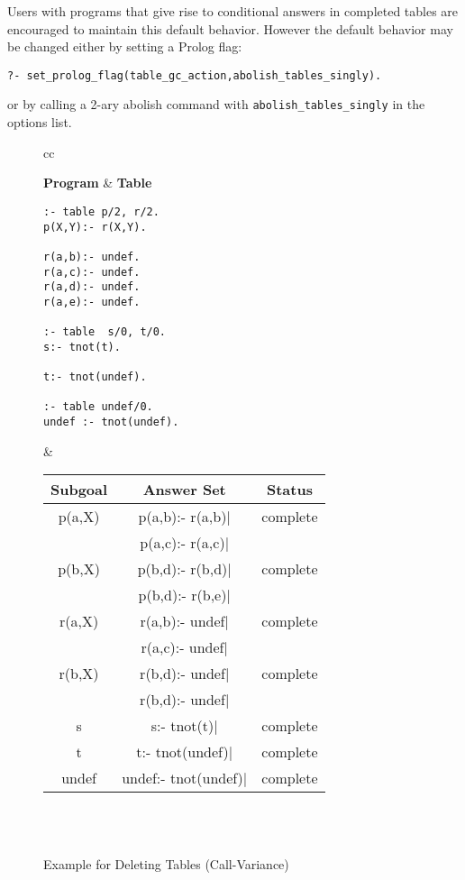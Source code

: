 \begin{description}
Users with programs that give rise to conditional answers in completed
tables are encouraged to maintain this default behavior.  However the
default behavior may be changed either by setting a Prolog flag:
%
\begin{verbatim}
?- set_prolog_flag(table_gc_action,abolish_tables_singly).
\end{verbatim}
%
or by calling a 2-ary abolish command with {\tt abolish\_tables\_singly}
in the options list.

\begin{figure}[htb]
\begin{center}
\begin{tabular}{cc}\hline \hline
\rule[-2ex]{0ex}{5ex} \textbf{Program} & \textbf{Table} \\
\begin{minipage}{14.5em}
\begin{verbatim}
:- table p/2, r/2.
p(X,Y):- r(X,Y).

r(a,b):- undef.
r(a,c):- undef.
r(a,d):- undef.
r(a,e):- undef.

:- table  s/0, t/0.
s:- tnot(t).

t:- tnot(undef).

:- table undef/0.
undef :- tnot(undef).
\end{verbatim}
\end{minipage}
&
\begin{tabular}{|c|c|c|} \hline
  Subgoal & Answer Set & Status\\ \hline \hline
  p(a,X)  & p(a,b):- r(a,b)$|$ & complete \\ 
          & p(a,c):- r(a,c)$|$ & \\ \hline
  p(b,X)  & p(b,d):- r(b,d)$|$ & complete \\ 
          & p(b,d):- r(b,e)$|$ & \\ \hline \hline
  r(a,X)  & r(a,b):- undef$|$  & complete \\ 
          & r(a,c):- undef$|$  & \\ \hline
  r(b,X)  & r(b,d):- undef$|$  & complete \\ 
          & r(b,d):- undef$|$  & \\ \hline \hline
  s       & s:- tnot(t)$|$     & complete \\ \hline \hline
  t       & t:- tnot(undef)$|$ & complete \\ \hline \hline
  undef   & undef:- tnot(undef)$|$ & complete \\ \hline \hline
\end{tabular} \\
\vspace*{-2ex} \\ \hline \hline
\end{tabular}
\end{center}
\caption{Example for Deleting Tables (Call-Variance)} \label{ex:deletion}
\end{figure}



\end{description}
